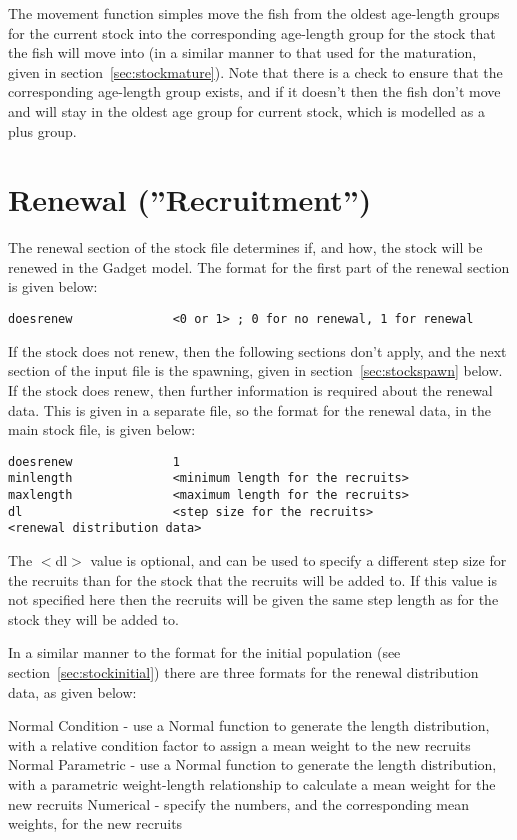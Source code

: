 \documentclass[10pt,twoside]{book}
\begin{document}
The movement function simples move the fish from the oldest age-length groups for the current stock into the corresponding age-length group for the stock that the fish will move into (in a similar manner to that used for the maturation, given in section~\ref{sec:stockmature}).  Note that there is a check to ensure that the corresponding age-length group exists, and if it doesn't then the fish don't move and will stay in the oldest age group for current stock, which is modelled as a plus group.

\section{Renewal (''Recruitment'')}\label{sec:stockrenew}
The renewal section of the stock file determines if, and how, the stock will be renewed in the Gadget model. The format for the first part of the renewal section is given below:

{\small\begin{verbatim}
doesrenew              <0 or 1> ; 0 for no renewal, 1 for renewal
\end{verbatim}}

If the stock does not renew, then the following sections don't apply, and the next section of the input file is the spawning, given in section~\ref{sec:stockspawn} below.  If the stock does renew, then further information is required about the renewal data.  This is given in a separate file, so the format for the renewal data, in the main stock file, is given below:

{\small\begin{verbatim}
doesrenew              1
minlength              <minimum length for the recruits>
maxlength              <maximum length for the recruits>
dl                     <step size for the recruits>
<renewal distribution data>
\end{verbatim}}

The $<$dl$>$ value is optional, and can be used to specify a different step size for the recruits than for the stock that the recruits will be added to.  If this value is not specified here then the recruits will be given the same step length as for the stock they will be added to.

\bigskip
In a similar manner to the format for the initial population (see section~\ref{sec:stockinitial}) there are three formats for the renewal distribution data, as given below:

\bigskip
Normal Condition - use a Normal function to generate the length distribution, with a relative condition factor to assign a mean weight to the new recruits\newline
Normal Parametric - use a Normal function to generate the length distribution, with a parametric weight-length relationship to calculate a mean weight for the new recruits\newline
Numerical - specify the numbers, and the corresponding mean weights, for the new recruits
\end{document}
